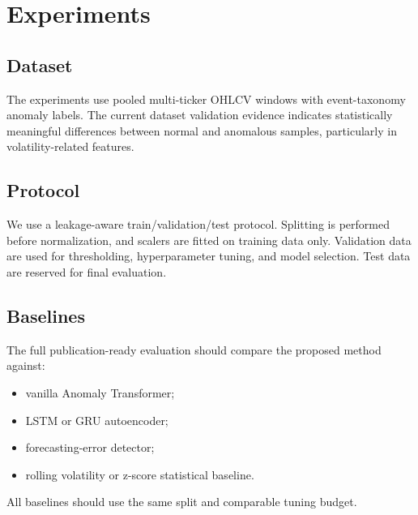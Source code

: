 \section{Experiments}

\subsection{Dataset}

The experiments use pooled multi-ticker OHLCV windows with event-taxonomy anomaly labels. The current dataset validation evidence indicates statistically meaningful differences between normal and anomalous samples, particularly in volatility-related features.

\subsection{Protocol}

We use a leakage-aware train/validation/test protocol. Splitting is performed before normalization, and scalers are fitted on training data only. Validation data are used for thresholding, hyperparameter tuning, and model selection. Test data are reserved for final evaluation.

\subsection{Baselines}

The full publication-ready evaluation should compare the proposed method against:

\begin{itemize}
  \item vanilla Anomaly Transformer;
  \item LSTM or GRU autoencoder;
  \item forecasting-error detector;
  \item rolling volatility or z-score statistical baseline.
\end{itemize}

All baselines should use the same split and comparable tuning budget.

